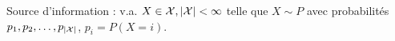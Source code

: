 \begin{defn}
	Source d'information : v.a. $X \in \mathcal{X}, \left\lvert\mathcal{X}\right\rvert < \infty$ telle que $X \sim P$ avec probabilités $p_1, p_2, \ldots, p_{\left\lvert\mathcal{X}\right\rvert}$, $p_i = P(X = i)$.
\end{defn}